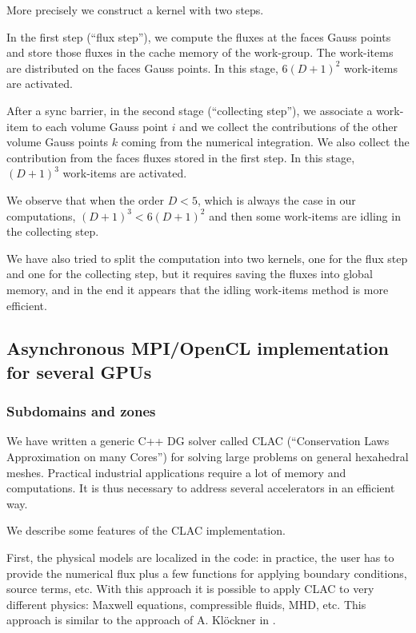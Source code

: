 \documentclass[preprint]{sig-alternate}
\begin{document}
More precisely we construct a kernel with two steps.

In the first step (``flux step''), we compute the fluxes at the faces Gauss points and store those fluxes in the cache memory of the work-group. The work-items are distributed on the faces Gauss points. In this stage, $6(D+1)^2$ work-items are activated.

After a sync barrier, in the second stage (``collecting step''), we associate a work-item to each volume Gauss point $i$ and we collect the contributions of the other volume Gauss points
$k$ coming from the numerical integration. We also collect the contribution from the faces fluxes stored in the first step. In this stage, $(D+1)^3$ work-items are activated.

We observe that when the order $D<5$, which is always the case in our computations, $(D+1)^3 < 6 (D+1)^2$ and then some work-items are idling in the collecting step.

We have also tried to split the computation into two kernels, one for the flux step and one for the collecting step, but it requires saving the fluxes into global memory, and in the end it appears that the idling work-items method is more efficient.



\subsection{Asynchronous MPI/OpenCL implementation for several GPUs}

\subsubsection{Subdomains and zones}
We have written a generic C++ DG solver called CLAC (``Conservation Laws Approximation on many Cores'') for solving large problems on general hexahedral meshes. Practical industrial applications require a lot of memory and computations. It is thus necessary to address several accelerators in an efficient way.

We describe some features of the CLAC implementation.

First, the physical models are localized in the code: in practice, the user has to provide the numerical flux plus a few functions for applying boundary conditions, source terms, etc. With this approach it is possible to apply CLAC to very different physics:  Maxwell equations, compressible fluids, MHD, etc. This approach is similar to the approach of A. Klöckner in \cite{kloeckner2010hedge}.
\end{document}

